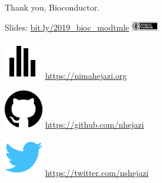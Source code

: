 \documentclass{beamer}
\begin{document}
\begin{frame}[c]{Thank you, Bioconductor.}

\large
Slides: \href{https://bit.ly/2019\_bioc\_modtmle}{bit.ly/2019\_bioc\_modtmle}
  \quad
\includegraphics[height=4mm]{Figs/cc-zero.png}

\vspace{2mm}
\includegraphics[scale=0.14]{homepage.png} \url{https://nimahejazi.org}

\vspace{2mm}
\includegraphics[scale=0.11]{github-icon.png}
  \url{https://github.com/nhejazi}

\vspace{2mm}
\includegraphics[scale=0.14]{twitter-icon.png}
  \url{https://twitter.com/nshejazi}


\end{frame}
\end{document}
